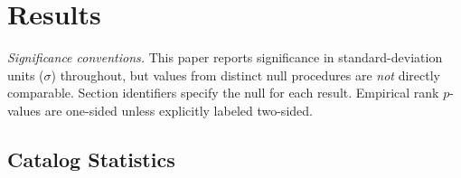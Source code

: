 \documentclass[twocolumn,linenumbers]{aastex702}
\begin{document}
\section{Results}
\label{sec:results}

\textit{Significance conventions.} This paper reports significance in standard-deviation units ($\sigma$) throughout, but values from distinct null procedures are \emph{not} directly comparable. Section identifiers specify the null for each result. Empirical rank $p$-values are one-sided unless explicitly labeled two-sided.

\begin{table}[t]
\caption{\textbf{Estimator callout.} P1 is the load-bearing cosmological result. P2 and D1--D2 are diagnostics with distinct samples and nulls; P2's $z\approx-7.6$ applies only to an observed-label template and becomes a $1.36\sigma_{\rm boot}$ comparison for a physical $1.7\%$ signal under $g=0.398$. Values across rows are not directly comparable as detection significances (Sec.~\ref{sec:notation}).\label{tab:primary_callout}}
\tiny
{}
\end{table}

\subsection{Catalog Statistics}
\label{sec:stats}
\end{document}
